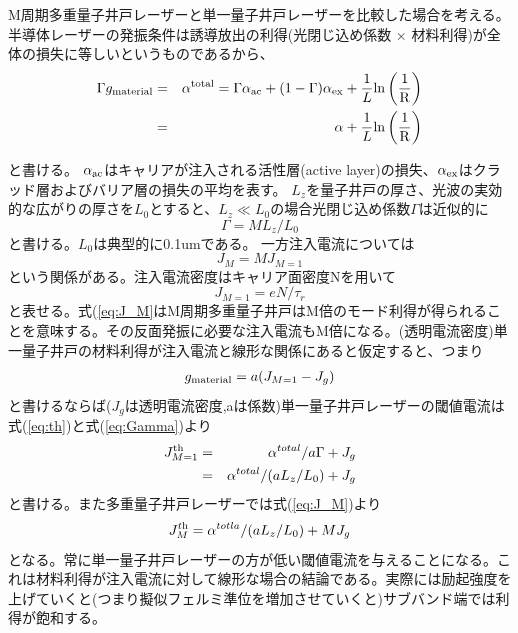 M周期多重量子井戸レーザーと単一量子井戸レーザーを比較した場合を考える。
半導体レーザーの発振条件は誘導放出の利得(光閉じ込め係数 × 材料利得)が全体の損失に等しいというものであるから、
\begin{eqnarray}
\label{eq:th}
\Gamma g_{\rm{material}}&=&\alpha^{\rm{total}}= \Gamma \alpha_{\rm{ac}} +(1-\Gamma)\alpha_{\rm{ex}}+\dfrac{1}{L}\rm{ln}\left( \dfrac{1}{R} \right )\\
&=& \alpha + \dfrac{1}{L}\rm{ln}\left( \dfrac{1}{R} \right )
\end{eqnarray}

と書ける。
$\alpha_{\rm{ac}}$はキャリアが注入される活性層(active layer)の損失、$\alpha_{\rm{ex}}$はクラッド層およびバリア層の損失の平均を表す。
$L_{z}$を量子井戸の厚さ、光波の実効的な広がりの厚さを$L_{0}$とすると、$L_{z}\ll L_{0}$の場合光閉じ込め係数$\Gamma$は近似的に
\begin{equation}
\Gamma = ML_{z}/L_{0}
\label{eq:Gamma}
\end{equation}
と書ける。$L_{0}$は典型的に0.1umである。
一方注入電流については
\begin{equation}
J_{M}=MJ_{M=1}
\label{eq:J_M}
\end{equation}
という関係がある。注入電流密度はキャリア面密度Nを用いて
\begin{equation}
J_{M=1}=eN/\tau_{r}
\end{equation}
と表せる。式(\ref{eq:J_M}はM周期多重量子井戸はM倍のモード利得が得られることを意味する。その反面発振に必要な注入電流もM倍になる。(透明電流密度)単一量子井戸の材料利得が注入電流と線形な関係にあると仮定すると、つまり
\begin{eqnarray}
g_{\rm{material}}=a(J_{M=1}-J_{g})
\end{eqnarray}
と書けるならば($J_{g}$は透明電流密度,aは係数)単一量子井戸レーザーの閾値電流は式(\ref{eq:th})と式(\ref{eq:Gamma})より
\begin{eqnarray}
J^{\rm{th}}_{M=1}&=&\alpha^{total}/ a\Gamma + J_{g}\nonumber\\
&=&\alpha^{total}/(aL_{z}/L_{0})+J_{g} 
\end{eqnarray}
と書ける。また多重量子井戸レーザーでは式(\ref{eq:J_M})より
\begin{equation}
J_{M}^{t\rm{h}}=\alpha^{totla}/(aL_{z}/L_{0}) + MJ_{g}
\label{eq:Mj0}
\end{equation}
となる。常に単一量子井戸レーザーの方が低い閾値電流を与えることになる。これは材料利得が注入電流に対して線形な場合の結論である。実際には励起強度を上げていくと(つまり擬似フェルミ準位を増加させていくと)サブバンド端では利得が飽和する。


